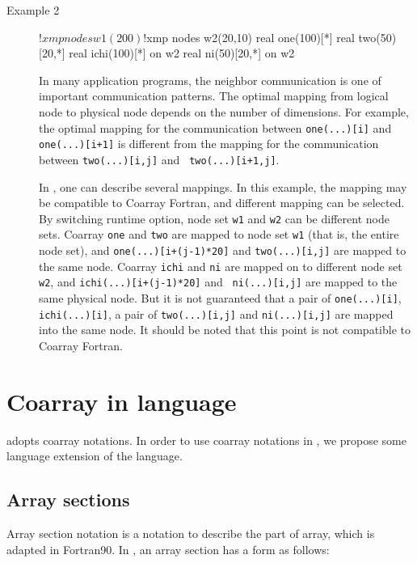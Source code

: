 \begin{description}
\item[Example 2]
\hspace{\hsize}
\begin{Fexample}
!$xmp nodes w1(200)
!$xmp nodes w2(20,10)
      real one(100)[*]
      real two(50)[20,*]
      real ichi(100)[*] on w2
      real ni(50)[20,*] on w2
\end{Fexample}

In many application programs, the neighbor communication
is one of important communication patterns. The optimal mapping from
logical node to physical node depends on the number of dimensions. For
example, the optimal mapping for the communication between
{\tt one(...)[i]} and {\tt one(...)[i+1]} is different from the
mapping for the communication between {\tt two(...)[i,j]} and {\tt
  two(...)[i+1,j]}. 

In \XMP, one can describe several mappings. In this example, the
mapping may be compatible to Coarray Fortran, and different mapping
can be selected. By switching runtime option, node set {\tt w1} and
{\tt w2} can be different node sets. Coarray {\tt one} and {\tt two}
are mapped to node set {\tt w1} (that is, the entire node set), and
{\tt one(...)[i+(j-1)*20]} and {\tt two(...)[i,j]} are mapped to the
same node. Coarray {\tt ichi} and {\tt ni} are mapped on to different
node set {\tt w2}, and {\tt ichi(...)[i+(j-1)*20]} and {\tt
  ni(...)[i,j]} are mapped to the same physical node. But it is not
guaranteed that a pair of {\tt one(...)[i]}, {\tt ichi(...)[i]}, a
pair of {\tt two(...)[i,j]} and {\tt ni(...)[i,j]} are
mapped into the same node. It should be noted that this point is not
compatible to Coarray Fortran. 

\end{description}

\section{Coarray in \C language}

\XMP adopts coarray notations. In order to use coarray notations in \C,
we propose some language extension of the language.

\subsection{Array sections}

Array section notation is a notation to describe the part of array,
which is adapted in Fortran90. In \C, an array section has a form as
follows:

